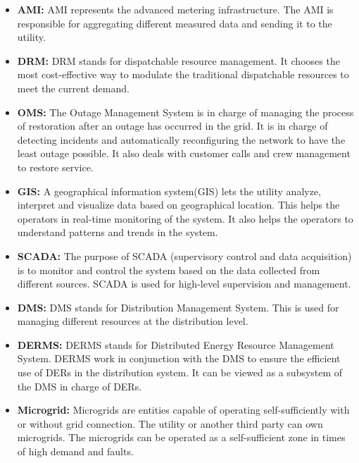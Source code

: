  \begin{itemize}
     \item \textbf{AMI:} AMI represents the advanced metering infrastructure. The AMI is responsible for aggregating different measured data and sending it to the utility.
     \item \textbf{DRM:} DRM stands for dispatchable resource management. It chooses the most cost-effective way to modulate the traditional dispatchable resources to meet the current demand.
     \item \textbf{OMS:} The Outage Management System is in charge of managing the process of restoration after an outage has occurred in the grid. It is in charge of detecting incidents and automatically reconfiguring the network to have the least outage possible. It also deals with customer calls and crew management to restore service.
     \item \textbf{GIS:} A geographical information system(GIS) lets the utility analyze, interpret and visualize data based on geographical location. This helps the operators in real-time monitoring of the system. It also helps the operators to understand patterns and trends in the system.
     \item \textbf{SCADA:} The purpose of SCADA (supervisory control and data acquisition) is to monitor and control the system based on the data collected from different sources. SCADA is used for high-level supervision and management.
     \item \textbf{DMS:} DMS stands for Distribution Management System. This is used for managing different resources at the distribution level.
     \item \textbf{DERMS:} DERMS stands for Distributed Energy Resource Management System. DERMS work in conjunction with the DMS to ensure the efficient use of DERs in the distribution system. It can be viewed as a subsystem of the DMS in charge of DERs.
     \item \textbf{Microgrid:} Microgrids are entities capable of operating self-sufficiently with or without grid connection. The utility or another third party can own microgrids. The microgrids can be operated as a self-sufficient zone in times of high demand and faults.
 \end{itemize}

